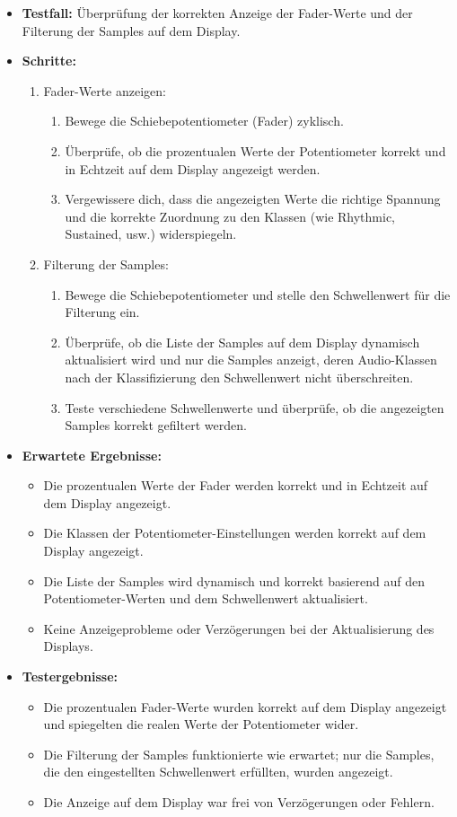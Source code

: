 \begin{itemize}
	\item \textbf{Testfall:} Überprüfung der korrekten Anzeige der Fader-Werte und der Filterung der Samples auf dem Display.
	\item \textbf{Schritte:}
	\begin{enumerate}
		\item Fader-Werte anzeigen:
		\begin{enumerate}
			\item Bewege die Schiebepotentiometer (Fader) zyklisch.
			\item Überprüfe, ob die prozentualen Werte der Potentiometer korrekt und in Echtzeit auf dem Display angezeigt werden.
			\item Vergewissere dich, dass die angezeigten Werte die richtige Spannung und die korrekte Zuordnung zu den Klassen (wie Rhythmic, Sustained, usw.) widerspiegeln.
		\end{enumerate}
		\item Filterung der Samples:
		\begin{enumerate}
			\item Bewege die Schiebepotentiometer und stelle den Schwellenwert für die Filterung ein.
			\item Überprüfe, ob die Liste der Samples auf dem Display dynamisch aktualisiert wird und nur die Samples anzeigt, deren Audio-Klassen nach der Klassifizierung den Schwellenwert nicht überschreiten.
			\item Teste verschiedene Schwellenwerte und überprüfe, ob die angezeigten Samples korrekt gefiltert werden.
		\end{enumerate}
	\end{enumerate}
	\item \textbf{Erwartete Ergebnisse:}
	\begin{itemize}
		\item Die prozentualen Werte der Fader werden korrekt und in Echtzeit auf dem Display angezeigt.
		\item Die Klassen der Potentiometer-Einstellungen werden korrekt auf dem Display angezeigt.
		\item Die Liste der Samples wird dynamisch und korrekt basierend auf den Potentiometer-Werten und dem Schwellenwert aktualisiert.
		\item Keine Anzeigeprobleme oder Verzögerungen bei der Aktualisierung des Displays.
	\end{itemize}
	\item \textbf{Testergebnisse:}
	\begin{itemize}
		\item Die prozentualen Fader-Werte wurden korrekt auf dem Display angezeigt und spiegelten die realen Werte der Potentiometer wider.
		\item Die Filterung der Samples funktionierte wie erwartet; nur die Samples, die den eingestellten Schwellenwert erfüllten, wurden angezeigt.
		\item Die Anzeige auf dem Display war frei von Verzögerungen oder Fehlern.
	\end{itemize}
\end{itemize}

